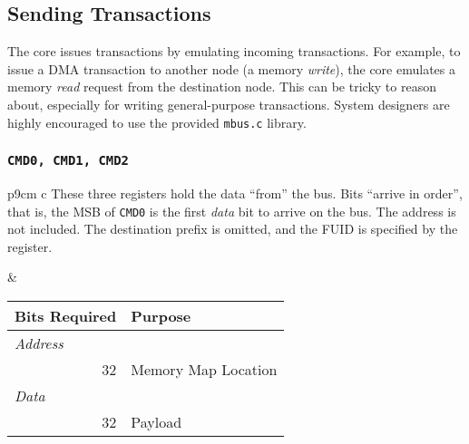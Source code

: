 \newpage
\subsection{Sending \bus Transactions}
\label{prog:send-txn}

The core issues \bus transactions by emulating incoming \bus transactions. For
example, to issue a DMA transaction to another node (a memory \emph{write}),
the core emulates a memory \emph{read} request from the destination node. This
can be tricky to reason about, especially for writing general-purpose
transactions. System designers are highly encouraged to use the provided
\texttt{mbus.c} library.


\subsubsection{\texttt{CMD0, CMD1, CMD2}}
\label{prog:mmap:cmd}
\begin{tabular}{p{9cm} c}
\vspace{-4em}
These three registers hold the data ``from'' the bus. Bits ``arrive in
order'', that is, the MSB of \texttt{CMD0} is the first \emph{data} bit to
arrive on the bus. The address is not included. The destination
prefix is omitted, and the FUID is specified by the
 register.

&

\begin{tabular}{r l}
  Bits Required & Purpose \\
  \hline
  \hline
  \multicolumn{1}{l}{\em Address} & \\
  32 & Memory Map Location \\
  \multicolumn{1}{l}{\em Data} & \\
  32 & Payload \\
\end{tabular}

\\
\end{tabular}

